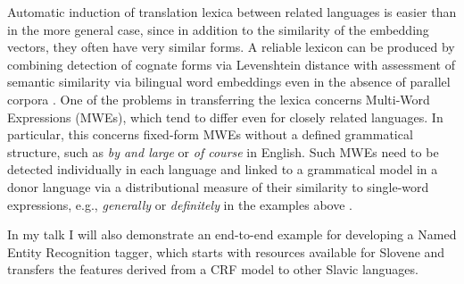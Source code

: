 \documentclass[11pt]{article}
\begin{document}
Automatic induction of translation lexica between related languages is easier than in the more general case, since in addition to the similarity of the embedding vectors, they often have very similar forms.  A reliable lexicon can be produced by combining detection of cognate forms via Levenshtein distance with assessment of semantic similarity via bilingual word embeddings even in the absence of parallel corpora \cite{upadhyay16}.
One of the problems in transferring the lexica concerns Multi-Word Expressions (MWEs), which tend to differ even for closely related languages.  In particular, this concerns fixed-form MWEs without a defined grammatical structure, such as \textit{by and large} or \textit{of course} in English.  Such MWEs need to be detected individually in each language and linked to a grammatical model in a donor language via a distributional measure of their similarity to single-word expressions, e.g., \textit{generally} or \textit{definitely} in the examples above \cite{riedl15}.

In my talk I will also demonstrate an end-to-end example for developing a Named Entity Recognition tagger, which starts with resources available for Slovene and transfers the features derived from a CRF model \cite{lafferty01,benikova15} to other Slavic languages.



\end{document}
